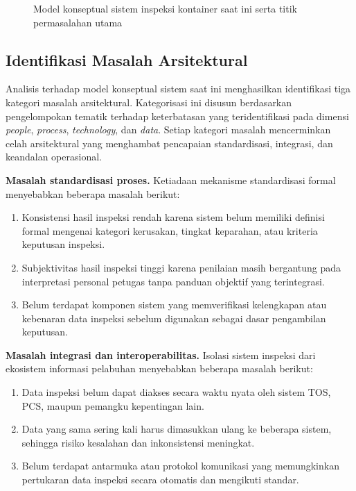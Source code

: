 \begin{figure}[ht]
{}
  \caption{Model konseptual sistem inspeksi kontainer saat ini serta titik permasalahan utama}
  \label{fig:model_konseptual_saat_ini}
\end{figure}

\subsection{Identifikasi Masalah Arsitektural}

Analisis terhadap model konseptual sistem saat ini menghasilkan identifikasi tiga kategori masalah arsitektural. Kategorisasi ini disusun berdasarkan pengelompokan tematik terhadap keterbatasan yang teridentifikasi pada dimensi \textit{people}, \textit{process}, \textit{technology}, dan \textit{data}. Setiap kategori masalah mencerminkan celah arsitektural yang menghambat pencapaian standardisasi, integrasi, dan keandalan operasional.

\textbf{Masalah standardisasi proses.}
Ketiadaan mekanisme standardisasi formal menyebabkan beberapa masalah berikut:

\begin{enumerate}
  \item Konsistensi hasil inspeksi rendah karena sistem belum memiliki definisi
  formal mengenai kategori kerusakan, tingkat keparahan, atau kriteria keputusan
  inspeksi.
  \item Subjektivitas hasil inspeksi tinggi karena penilaian masih bergantung
  pada interpretasi personal petugas tanpa panduan objektif yang terintegrasi.
  \item Belum terdapat komponen sistem yang memverifikasi kelengkapan atau
  kebenaran data inspeksi sebelum digunakan sebagai dasar pengambilan keputusan.
\end{enumerate}

\textbf{Masalah integrasi dan interoperabilitas.}
Isolasi sistem inspeksi dari ekosistem informasi pelabuhan menyebabkan beberapa
masalah berikut:

\begin{enumerate}
  \item Data inspeksi belum dapat diakses secara waktu nyata oleh sistem TOS,
  PCS, maupun pemangku kepentingan lain.
  \item Data yang sama sering kali harus dimasukkan ulang ke beberapa sistem,
  sehingga risiko kesalahan dan inkonsistensi meningkat.
  \item Belum terdapat antarmuka atau protokol komunikasi yang memungkinkan
  pertukaran data inspeksi secara otomatis dan mengikuti standar.
\end{enumerate}

